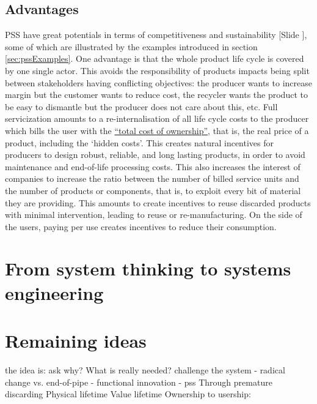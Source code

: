 \documentclass{article}
\newcounter{slide}
\begin{document}
\subsection{Advantages}
\label{sec:pssAdvantages}
PSS have great potentials in terms of competitiveness and sustainability {\color{blue}[Slide ]}, some of which are illustrated by the examples introduced in section \ref{sec:pssExamples}. One advantage is that the whole product life cycle is covered by one single actor. This avoids the responsibility of products impacts being split between stakeholders having conflicting objectives: the producer wants to increase margin but the customer wants to reduce cost, the recycler wants the product to be easy to dismantle but the producer does not care about this, etc. Full servicization amounts to a re-internalisation of all life cycle costs to the producer which bills the user with the \href{https://en.wikipedia.org/wiki/Total_cost_of_ownership}{``total cost of ownership''}, that is, the real price of a product, including the `hidden costs'. This creates natural incentives for producers to design robust, reliable, and long lasting products, in order to avoid maintenance and end-of-life processing costs. This also increases the interest of companies to increase the ratio between the number of billed service units and the number of products or components, that is, to exploit every bit of material they are providing. This amounts to create incentives to reuse discarded products with minimal intervention, leading to reuse or re-manufacturing. On the side of the users, paying per use creates incentives to reduce their consumption. 

\section{From system thinking to systems engineering}
\label{sec:sysEng}

 
{\color{red}
\section*{Remaining ideas}
the idea is: ask why? What is really needed? challenge the system
 - radical change vs. end-of-pipe 
 - functional innovation
 - pss
Through premature discarding
Physical lifetime  Value lifetime 
Ownership to usership: %
}
\end{document}
